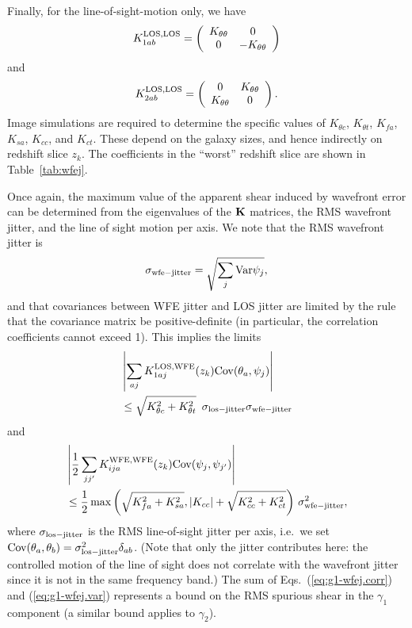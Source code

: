 \documentclass[aps,prd, amsmath,amssymb,superscriptaddress,showkeys,nofootinbib,reprint,preprintnumbers]{revtex4-1}
\begin{document}
Finally, for the line-of-sight-motion only, we have
\begin{equation}
K_{1ab}^{\rm LOS,LOS} = \left( \begin{array}{cc} K_{\theta\theta} & 0 \\ 0 & -K_{\theta\theta} \end{array} \right)
\end{equation}
and
\begin{equation}
K_{2ab}^{\rm LOS,LOS} = \left( \begin{array}{cc} 0 & K_{\theta\theta} \\ K_{\theta\theta} & 0 \end{array} \right).
\end{equation}
Image simulations are required to determine the specific values of
$K_{\theta c}$, $K_{\theta t}$, $K_{fa}$, $K_{sa}$, $K_{cc}$, and
$K_{ct}$. These depend on the galaxy sizes, and hence indirectly on
redshift slice $z_k$. The coefficients in the ``worst'' redshift slice
are shown in Table~\ref{tab:wfej}.

Once again, the maximum value of the apparent shear induced by
wavefront error can be determined from the eigenvalues of the ${\bf
K}$ matrices, the RMS wavefront jitter, and the line of sight motion
per axis. We note that the RMS wavefront jitter is
\begin{equation}
\sigma_{\rm wfe-jitter} = \sqrt{\sum_j {\rm Var} \psi_j},
\end{equation}
and that covariances between WFE jitter and LOS jitter are limited by the rule that the covariance matrix be positive-definite (in particular, the correlation coefficients cannot exceed 1). This implies the limits
\begin{align}
&\left|\sum_{aj} K^{\rm LOS,WFE}_{1aj}(z_k) {\rm
Cov}({\theta}_a,{\psi}_j)\right| \nonumber\\
&\le \sqrt{K_{\theta c}^2 + K_{\theta
t}^2}~\, \sigma_{\rm los-jitter} \sigma_{\rm wfe-jitter}
\label{eq:g1-wfej.corr}
\end{align}
and
\begin{align}
&\left|\frac12 \sum_{jj'} K^{\rm WFE,WFE}_{ija}(z_k) {\rm
Cov}({\psi}_j,{\psi}_{j'})\right| \nonumber\\
&\le \frac12 \max\left(
\sqrt{K_{fa}^2+K_{sa}^2}, |K_{cc}|+\sqrt{K_{cc}^2+K_{ct}^2}
\right)\,\sigma_{\rm wfe-jitter}^2,
\label{eq:g1-wfej.var}
\end{align}
where $\sigma_{\rm los-jitter}$ is the RMS line-of-sight jitter per
axis, i.e.\ we set ${\rm Cov}(\theta_a,\theta_b) = \sigma_{\rm
los-jitter}^2\delta_{ab}$. (Note that only the jitter contributes
here: the controlled motion of the line of sight does not correlate
with the wavefront jitter since it is not in the same frequency band.)
The sum of Eqs.~(\ref{eq:g1-wfej.corr}) and (\ref{eq:g1-wfej.var})
represents a bound on the RMS spurious shear in the $\gamma_1$
component (a similar bound applies to $\gamma_2$).
\end{document}
